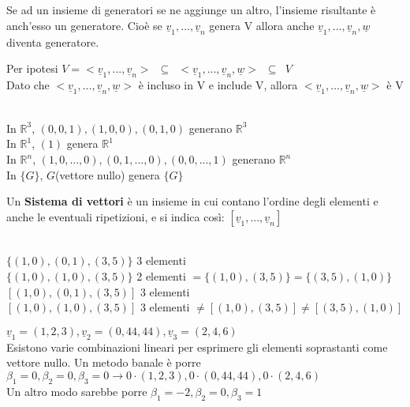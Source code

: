 \begin{nota}
	Se ad un insieme di generatori se ne aggiunge un altro, l'insieme risultante è anch'esso un generatore. Cioè se $\underline{v}_1,...,\underline{v}_n$ genera V allora anche $\underline{v}_1,...,\underline{v}_n,\underline{w}$ diventa generatore.
	\begin{dimostrazione}
		Per ipotesi $V=<\underline{v}_1,...,\underline{v}_n>\phantom{1}\subseteq\phantom{1}<\underline{v}_1,...,\underline{v}_n,\underline{w}>\phantom{1}\subseteq\phantom{1} V$\\
		Dato che $<\underline{v}_1,...,\underline{v}_n,\underline{w}>$ è incluso in V e include V, allora $<\underline{v}_1,...,\underline{v}_n,\underline{w}>$ è V\\
		\begin{es}
			\phantom{}\\
			In $\mathbb{R}^3$, $(0,0,1),(1,0,0),(0,1,0)$ generano $\mathbb{R}^3$\\
			In $\mathbb{R}^1$, $(1)$ genera $\mathbb{R}^1$\\
			In $\mathbb{R}^n$, $(1,0,...,0),(0,1,...,0),(0,0,...,1)$ generano $\mathbb{R}^n$\\
			In $\{G\}$, $G$(vettore nullo) genera $\{G\}$ 
		\end{es}
	\end{dimostrazione}
\end{nota}

Un \textbf{Sistema di vettori} è un insieme in cui contano l'ordine degli elementi e anche le eventuali ripetizioni, e si indica così: $[\underline{v}_1,...,\underline{v}_n]$
\begin{es}
	\phantom{}\\
	$\{(1,0),(0,1),(3,5)\}$ 3 elementi\\
	$\{(1,0),(1,0),(3,5)\}$ 2 elementi $=\{(1,0),(3,5)\}=\{(3,5),(1,0)\}$\\
	$[(1,0),(0,1),(3,5)]$ 3 elementi\\
	$[(1,0),(1,0),(3,5)]$ 3 elementi $\neq[(1,0),(3,5)]\neq[(3,5),(1,0)]$ 
\end{es}
\begin{nota}
$\underline{v}_1=(1,2,3), \underline{v}_2=(0,44,44), \underline{v}_3=(2,4,6)$\\
Esistono varie combinazioni lineari per esprimere gli elementi soprastanti come vettore nullo. Un metodo banale è porre $\beta_1=0,\beta_2=0,\beta_3=0 \longrightarrow 0\cdot(1,2,3),0\cdot(0,44,44), 0\cdot(2,4,6)$\\
Un altro modo sarebbe porre $\beta_1=-2,\beta_2=0,\beta_3=1$
\end{nota}

